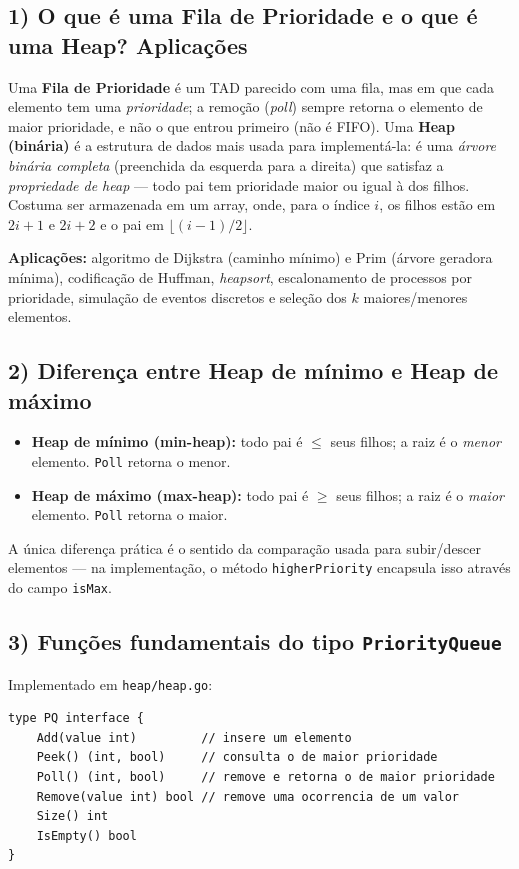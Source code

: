 \documentclass[11pt,a4paper]{article}
\begin{document}
\subsection*{1) O que é uma Fila de Prioridade e o que é uma Heap? Aplicações}
Uma \textbf{Fila de Prioridade} é um TAD parecido com uma fila, mas em que cada elemento tem uma
\emph{prioridade}; a remoção (\emph{poll}) sempre retorna o elemento de maior prioridade, e não
o que entrou primeiro (não é FIFO). Uma \textbf{Heap (binária)} é a estrutura de dados mais usada
para implementá-la: é uma \emph{árvore binária completa} (preenchida da esquerda para a direita)
que satisfaz a \emph{propriedade de heap} --- todo pai tem prioridade maior ou igual à dos
filhos. Costuma ser armazenada em um array, onde, para o índice $i$, os filhos estão em $2i+1$ e
$2i+2$ e o pai em $\lfloor (i-1)/2 \rfloor$.
\par\noindent\textbf{Aplicações:} algoritmo de Dijkstra (caminho mínimo) e Prim (árvore geradora
mínima), codificação de Huffman, \emph{heapsort}, escalonamento de processos por prioridade,
simulação de eventos discretos e seleção dos $k$ maiores/menores elementos.

\subsection*{2) Diferença entre Heap de mínimo e Heap de máximo}
\begin{itemize}[noitemsep]
  \item \textbf{Heap de mínimo (min-heap):} todo pai é $\le$ seus filhos; a raiz é o
        \emph{menor} elemento. \texttt{Poll} retorna o menor.
  \item \textbf{Heap de máximo (max-heap):} todo pai é $\ge$ seus filhos; a raiz é o
        \emph{maior} elemento. \texttt{Poll} retorna o maior.
\end{itemize}
A única diferença prática é o sentido da comparação usada para subir/descer elementos --- na
implementação, o método \texttt{higherPriority} encapsula isso através do campo \texttt{isMax}.

\subsection*{3) Funções fundamentais do tipo \texttt{PriorityQueue}}
Implementado em \texttt{heap/heap.go}:
\begin{lstlisting}
type PQ interface {
    Add(value int)         // insere um elemento
    Peek() (int, bool)     // consulta o de maior prioridade
    Poll() (int, bool)     // remove e retorna o de maior prioridade
    Remove(value int) bool // remove uma ocorrencia de um valor
    Size() int
    IsEmpty() bool
}
\end{lstlisting}
\end{document}
